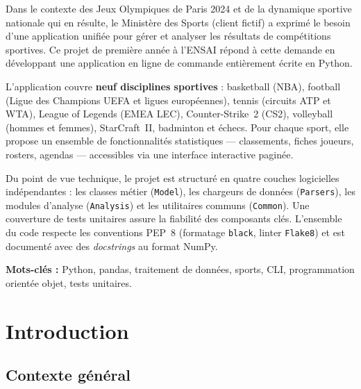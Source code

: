 \documentclass[12pt,a4paper]{article}
\newcommand{\code}[1]{\texttt{#1}}
\begin{document}
Dans le contexte des Jeux Olympiques de Paris 2024 et de la dynamique sportive
nationale qui en résulte, le Ministère des Sports (client fictif) a exprimé le
besoin d'une application unifiée pour gérer et analyser les résultats de
compétitions sportives. Ce projet de première année à l'ENSAI répond à cette
demande en développant une application en ligne de commande entièrement écrite
en Python.

L'application couvre \textbf{neuf disciplines sportives} : basketball (NBA),
football (Ligue des Champions UEFA et ligues européennes), tennis (circuits ATP
et WTA), League of Legends (EMEA LEC), Counter-Strike~2 (CS2), volleyball
(hommes et femmes), StarCraft~II, badminton et échecs. Pour chaque sport, elle
propose un ensemble de fonctionnalités statistiques — classements, fiches
joueurs, rosters, agendas — accessibles via une interface interactive
paginée.

Du point de vue technique, le projet est structuré en quatre couches
logicielles indépendantes : les classes métier (\code{Model}), les chargeurs
de données (\code{Parsers}), les modules d'analyse (\code{Analysis}) et les
utilitaires communs (\code{Common}). Une couverture de tests unitaires assure
la fiabilité des composants clés. L'ensemble du code respecte les conventions
PEP~8 (formatage \code{black}, linter \code{Flake8}) et est documenté avec des
\textit{docstrings} au format NumPy.

\bigskip
\textbf{Mots-clés :} Python, pandas, traitement de données, sports, CLI, programmation
orientée objet, tests unitaires.

\newpage

\thispagestyle{empty}
\tableofcontents
\newpage

\setcounter{page}{1}

\section{Introduction}

\subsection{Contexte général}
\end{document}
